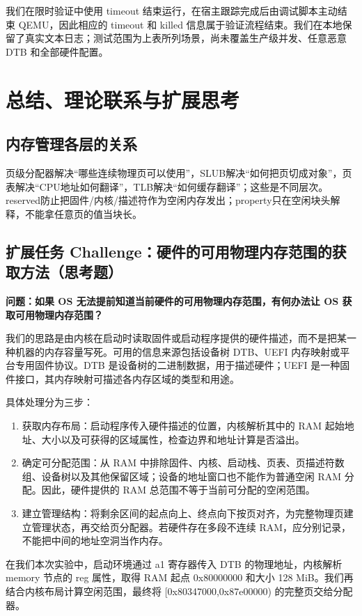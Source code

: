 \documentclass[UTF8,a4paper,10pt]{ctexart}
\begin{document}
我们在限时验证中使用 timeout 结束运行，在宿主跟踪完成后由调试脚本主动结束 QEMU，因此相应的 timeout 和 killed 信息属于验证流程结束。我们在本地保留了真实文本日志；测试范围为上表所列场景，尚未覆盖生产级并发、任意恶意 DTB 和全部硬件配置。


\section{总结、理论联系与扩展思考}

\subsection{内存管理各层的关系}

页级分配器解决“哪些连续物理页可以使用”，SLUB解决“如何把页切成对象”，页表解决“CPU地址如何翻译”，TLB解决“如何缓存翻译”；这些是不同层次。reserved防止把固件/内核/描述符作为空闲内存发出；property只在空闲块头解释，不能拿任意页的值当块长。


\subsection{扩展任务 Challenge：硬件的可用物理内存范围的获取方法（思考题）}

\textbf{问题：如果 OS 无法提前知道当前硬件的可用物理内存范围，有何办法让 OS 获取可用物理内存范围？}


我们的思路是由内核在启动时读取固件或启动程序提供的硬件描述，而不是把某一种机器的内存容量写死。可用的信息来源包括设备树 DTB、UEFI 内存映射或平台专用固件协议。DTB 是设备树的二进制数据，用于描述硬件；UEFI 是一种固件接口，其内存映射可描述各内存区域的类型和用途。


具体处理分为三步：


\begin{enumerate}
\item 获取内存布局：启动程序传入硬件描述的位置，内核解析其中的 RAM 起始地址、大小以及可获得的区域属性，检查边界和地址计算是否溢出。

\item 确定可分配范围：从 RAM 中排除固件、内核、启动栈、页表、页描述符数组、设备树以及其他保留区域；设备的地址窗口也不能作为普通空闲 RAM 分配。因此，硬件提供的 RAM 总范围不等于当前可分配的空闲范围。

\item 建立管理结构：将剩余区间的起点向上、终点向下按页对齐，为完整物理页建立管理状态，再交给页分配器。若硬件存在多段不连续 RAM，应分别记录，不能把中间的地址空洞当作内存。

\end{enumerate}
在我们本次实验中，启动环境通过 a1 寄存器传入 DTB 的物理地址，内核解析 memory 节点的 reg 属性，取得 RAM 起点 0x80000000 和大小 128 MiB。我们再结合内核布局计算空闲范围，最终将 [0x80347000,0x87e00000) 的完整页交给分配器。
\end{document}
